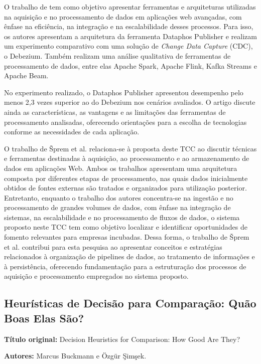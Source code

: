 O trabalho de  tem como objetivo apresentar ferramentas e arquiteturas utilizadas na aquisição e no processamento de dados em aplicações web avançadas, com ênfase na eficiência, na integração e na escalabilidade desses processos. Para isso, os autores apresentam a arquitetura da ferramenta Dataphos Publisher e realizam um experimento comparativo com uma solução de \textit{Change Data Capture} (CDC), o Debezium. Também realizam uma análise qualitativa de ferramentas de processamento de dados, entre elas Apache Spark, Apache Flink, Kafka Streams e Apache Beam.

No experimento realizado, o Dataphos Publisher apresentou desempenho pelo menos 2,3 vezes superior ao do Debezium nos cenários avaliados. O artigo discute ainda as características, as vantagens e as limitações das ferramentas de processamento analisadas, oferecendo orientações para a escolha de tecnologias conforme as necessidades de cada aplicação.

O trabalho de Šprem et al. relaciona-se à proposta deste TCC ao discutir técnicas e ferramentas destinadas à aquisição, ao processamento e ao armazenamento de dados em aplicações Web. Ambos os trabalhos apresentam uma arquitetura composta por diferentes etapas de processamento, nas quais dados inicialmente obtidos de fontes externas são tratados e organizados para utilização posterior. Entretanto, enquanto o trabalho dos autores concentra-se na ingestão e no processamento de grandes volumes de dados, com ênfase na integração de sistemas, na escalabilidade e no processamento de fluxos de dados, o sistema proposto neste TCC tem como objetivo localizar e identificar oportunidades de fomento relevantes para empresas incubadas. Dessa forma, o trabalho de Šprem et al. contribui para esta pesquisa ao apresentar conceitos e estratégias relacionados à organização de pipelines de dados, ao tratamento de informações e à persistência, oferecendo fundamentação para a estruturação dos processos de aquisição e processamento empregados no sistema proposto.

\subsection{Heurísticas de Decisão para Comparação: Quão Boas Elas São?}

\textbf{Título original:} Decision Heuristics for Comparison: How Good Are They?

\textbf{Autores:} Marcus Buckmann e Özgür Şimşek.

